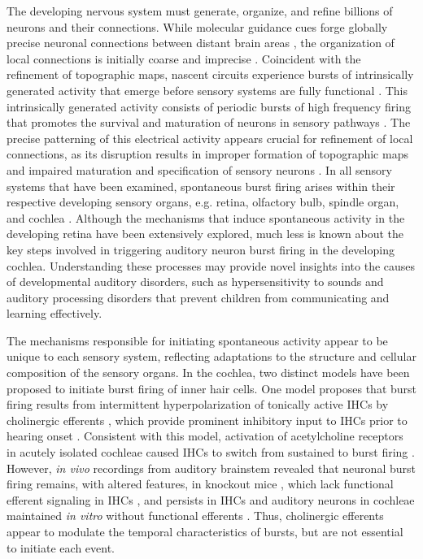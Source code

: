 \documentclass[9pt,lineno]{elife}
\begin{document}
The developing nervous system must generate, organize, and refine billions of neurons and their connections. While molecular guidance cues forge globally precise neuronal connections between distant brain areas \citep{Stoeckli2018,Dickson2002}, the organization of local connections is initially coarse and imprecise \citep{Dhande2011,Kirkby2013,Sretavan1986}. Coincident with the refinement of topographic maps, nascent circuits experience bursts of intrinsically generated activity that emerge before sensory systems are fully functional \citep{Kirkby2013}. This intrinsically generated activity consists of periodic bursts of high frequency firing that promotes the survival and maturation of neurons in sensory pathways \citep{Blankenship2010, Moody2005}. The precise patterning of this electrical activity appears crucial for refinement of local connections, as its disruption results in improper formation of topographic maps \citep{Anton-Bolanos2019,Burbridge2014,Xu2011} and impaired maturation and specification of sensory neurons \citep{Shrestha2018b,Sun2018}. In all sensory systems that have been examined, spontaneous burst firing arises within their respective developing sensory organs, e.g. retina, olfactory bulb, spindle organ, and cochlea \citep{Blankenship2010}. Although the mechanisms that induce spontaneous activity in the developing retina have been extensively explored, much less is known about the key steps involved in triggering auditory neuron burst firing in the developing cochlea. Understanding these processes may provide novel insights into the causes of developmental auditory disorders, such as hypersensitivity to sounds and auditory processing disorders that prevent children from communicating and learning effectively.

The mechanisms responsible for initiating spontaneous activity appear to be unique to each sensory system, reflecting adaptations to the structure and cellular composition of the sensory organs. In the cochlea, two distinct models have been proposed to initiate burst firing of inner hair cells. One model proposes that burst firing results from intermittent hyperpolarization of tonically active IHCs by cholinergic efferents \citep{Johnson2011, Wang2014}, which provide prominent inhibitory input to IHCs prior to hearing onset \citep{Glowatzki2000}. Consistent with this model, activation of acetylcholine receptors in acutely isolated cochleae caused IHCs to switch from sustained to burst firing \citep{Johnson2011}. However, \textit{in vivo} recordings from auditory brainstem revealed that neuronal burst firing remains, with altered features, in  knockout mice \citep{Clause2014}, which lack functional efferent signaling in IHCs \citep{Johnson2013}, and persists in IHCs and auditory neurons in cochleae maintained \textit{in vitro} without functional efferents \citep{Johnson2013}. Thus, cholinergic efferents appear to modulate the temporal characteristics of bursts, but are not essential to initiate each event. 
\end{document}

